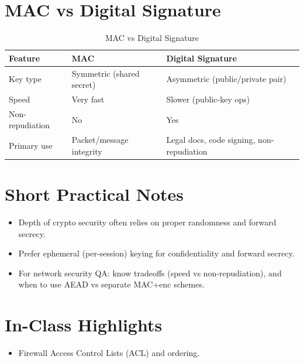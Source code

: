 \documentclass[11pt]{article}
\begin{document}
\section{MAC vs Digital Signature}

\begin{table}[h]
\centering
\begin{tabular}{l l l}
\toprule
\textbf{Feature} & \textbf{MAC} & \textbf{Digital Signature} \\
\midrule
Key type & Symmetric (shared secret) & Asymmetric (public/private pair) \\
Speed & Very fast & Slower (public-key ops) \\
Non-repudiation & No & Yes \\
Primary use & Packet/message integrity & Legal docs, code signing, non-repudiation \\
\bottomrule
\end{tabular}
\caption{MAC vs Digital Signature}
\end{table}

\section{Short Practical Notes}
\begin{itemize}
  \item Depth of crypto security often relies on proper randomness and forward secrecy.
  
  \item Prefer ephemeral (per-session) keying for confidentiality and forward secrecy.
  
  \item For network security QA: know tradeoffs (speed vs non-repudiation), and when to use AEAD vs separate MAC+enc schemes.
\end{itemize}

\section{In-Class Highlights}
\begin{itemize}
  \item Firewall Access Control Lists (ACL) and ordering.
\end{itemize}
\end{document}
